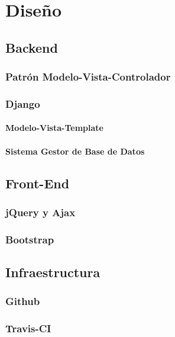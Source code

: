 \chapter{Diseño}
\label{cap:disenio}

\section{Backend}

\subsection{Patrón Modelo-Vista-Controlador}

\subsection{Django}

\subsubsection{Modelo-Vista-Template}

\subsubsection{Sistema Gestor de Base de Datos}

\section{Front-End}

\subsection{jQuery y Ajax}

\subsection{Bootstrap}

\section{Infraestructura}

\subsection{Github}

\subsection{Travis-CI}

